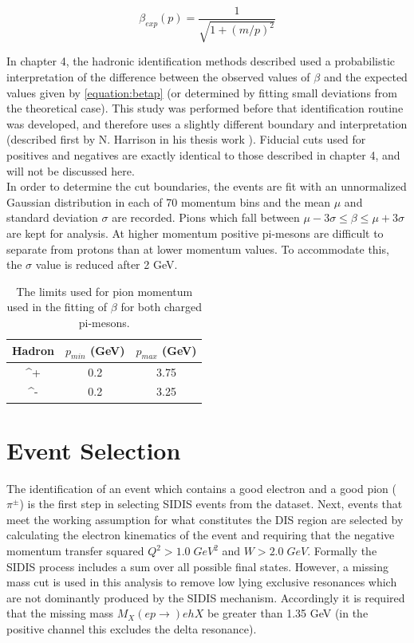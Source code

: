 \begin{equation}
	\label{equation:betap}
	\beta_{exp} (p) = \frac{1}{\sqrt{1 + (m/p)^2}}
\end{equation}

In chapter 4, the hadronic identification methods described used a probabilistic interpretation of the difference between the observed values of $\beta$ and the expected values given by \ref{equation:betap} (or determined by fitting small deviations from the theoretical case).  This study was performed before that identification routine was developed, and therefore uses a slightly different boundary and interpretation (described first by N. Harrison in his thesis work \cite{theses-harrison:2015}).  Fiducial cuts used for positives and negatives are exactly identical to those described in chapter 4, and will not be discussed here.  \\

In order to determine the cut boundaries, the events are fit with an unnormalized Gaussian distribution in each of 70 momentum bins and the mean $\mu$ and standard deviation $\sigma$ are recorded.  Pions which fall between $\mu - 3\sigma \leq \beta \leq \mu + 3 \sigma$ are kept for analysis.  At higher momentum positive pi-mesons are difficult to separate from protons than at lower momentum values.  To accommodate this, the $\sigma$ value is reduced after 2 GeV.  \\

\begin{table}
	\label{table:hadron-id-nathan}
  \centering
  \begin{tabular}{c|c|c}
    Hadron & $p_{min}$ (GeV) & $p_{max}$ (GeV) \\
    \hline 
	\pi^+ & 0.2 & 3.75 \\
	\pi^- & 0.2 & 3.25 \\
  \end{tabular}
  \caption[Limits for pion momentum used in fitting $\beta$.]{The limits used for pion momentum used in the fitting of $\beta$ for both charged pi-mesons.}
\end{table} 
 
\section{Event Selection}
The identification of an event which contains a good electron and a good pion ($\pi^{\pm}$) is the first step in selecting SIDIS events from the dataset.  Next, events that meet the working assumption for what constitutes the DIS region are selected by calculating the electron kinematics of the event and requiring that the negative momentum transfer squared $Q^2 > 1.0 \; GeV^2$ and $W > 2.0 \; GeV$.  Formally the SIDIS process includes a sum over all possible final states. However, a missing mass cut is used in this analysis to remove low lying exclusive resonances which are not dominantly produced by the SIDIS mechanism.  Accordingly it is required that the missing mass $M_X (e p \rightarrow)e h X$ be greater than 1.35 GeV (in the positive channel this excludes the delta resonance).  \\

